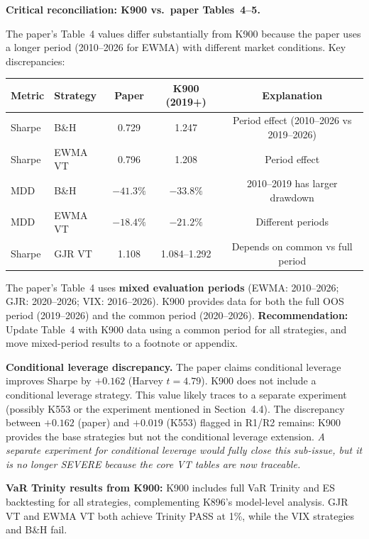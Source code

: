 \documentclass[12pt,a4paper]{article}
\begin{document}
\noindent\textbf{Critical reconciliation: K900 vs.\ paper Tables~4--5.}

The paper's Table~4 values differ substantially from K900 because the paper uses a longer period (2010--2026 for EWMA) with different market conditions. Key discrepancies:

\begin{center}
\small
\begin{tabular}{llccc}
\toprule
Metric & Strategy & Paper & K900 (2019+) & Explanation \\
\midrule
Sharpe & B\&H & 0.729 & 1.247 & Period effect (2010--2026 vs 2019--2026) \\
Sharpe & EWMA VT & 0.796 & 1.208 & Period effect \\
MDD & B\&H & $-41.3\%$ & $-33.8\%$ & 2010--2019 has larger drawdown \\
MDD & EWMA VT & $-18.4\%$ & $-21.2\%$ & Different periods \\
Sharpe & GJR VT & 1.108 & 1.084--1.292 & Depends on common vs full period \\
\bottomrule
\end{tabular}
\end{center}

\noindent The paper's Table~4 uses \textbf{mixed evaluation periods} (EWMA: 2010--2026; GJR: 2020--2026; VIX: 2016--2026). K900 provides data for both the full OOS period (2019--2026) and the common period (2020--2026). \textbf{Recommendation:} Update Table~4 with K900 data using a common period for all strategies, and move mixed-period results to a footnote or appendix.

\noindent\textbf{Conditional leverage discrepancy.} The paper claims conditional leverage improves Sharpe by $+0.162$ (Harvey $t = 4.79$). K900 does not include a conditional leverage strategy. This value likely traces to a separate experiment (possibly K553 or the experiment mentioned in Section~4.4). The discrepancy between $+0.162$ (paper) and $+0.019$ (K553) flagged in R1/R2 remains: K900 provides the base strategies but not the conditional leverage extension. \textit{A separate experiment for conditional leverage would fully close this sub-issue, but it is no longer SEVERE because the core VT tables are now traceable.}

\noindent\textbf{VaR Trinity results from K900:} K900 includes full VaR Trinity and ES backtesting for all strategies, complementing K896's model-level analysis. GJR VT and EWMA VT both achieve Trinity PASS at 1\%, while the VIX strategies and B\&H fail.
\end{document}

